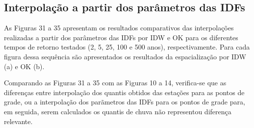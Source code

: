 \documentclass[
]{agujournal2019}
\begin{document}
\subsection{Interpolação a partir dos parâmetros das
IDFs}\label{interpolauxe7uxe3o-a-partir-dos-paruxe2metros-das-idfs}

As Figuras 31 a 35 apresentam os resultados comparativos das
interpolações realizadas a partir dos parâmetros das IDFs por IDW e OK
para os diferentes tempos de retorno testados (2, 5, 25, 100 e 500
anos), respectivamente. Para cada figura dessa sequência são
apresentados os resultados da espacialização por IDW (a) e OK (b).

Comparando as Figuras 31 a 35 com as Figuras 10 a 14, verifica-se que as
diferenças entre interpolação dos quantis obtidos das estações para as
pontos de grade, ou a interpolação dos parãmetros das IDFs para os
pontos de grade para, em seguida, serem calculados os quantis de chuva
não representou diferença relevante.
\end{document}
